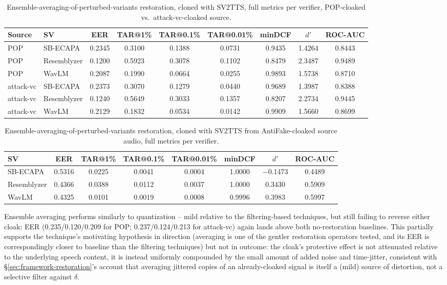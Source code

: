\documentclass[11pt]{article}
\begin{document}
\begin{table}[H]
\centering
\caption{Ensemble-averaging-of-perturbed-variants restoration, cloned
with SV2TTS, full metrics per verifier, POP-cloaked vs.\
attack-vc-cloaked source.}
\label{tab:restoration-ensemble-results}
\begin{tabular}{llccccccc}
\toprule
Source & SV & EER & TAR@1\% & TAR@0.1\% & TAR@0.01\% & minDCF & $d'$ & ROC-AUC \\
\midrule
POP        & SB-ECAPA    & 0.2345 & 0.3100 & 0.1388 & 0.0731 & 0.9435 & 1.4264 & 0.8443 \\
POP        & Resemblyzer & 0.1200 & 0.5923 & 0.3078 & 0.1102 & 0.8479 & 2.3487 & 0.9489 \\
POP        & WavLM       & 0.2087 & 0.1990 & 0.0664 & 0.0255 & 0.9893 & 1.5738 & 0.8710 \\
\addlinespace
attack-vc  & SB-ECAPA    & 0.2373 & 0.3070 & 0.1279 & 0.0440 & 0.9689 & 1.3987 & 0.8388 \\
attack-vc  & Resemblyzer & 0.1240 & 0.5649 & 0.3033 & 0.1357 & 0.8207 & 2.2734 & 0.9445 \\
attack-vc  & WavLM       & 0.2129 & 0.1832 & 0.0534 & 0.0142 & 0.9909 & 1.5660 & 0.8699 \\
\bottomrule
\end{tabular}
\end{table}

\begin{table}[H]
\centering
\caption{Ensemble-averaging-of-perturbed-variants restoration, cloned
with SV2TTS from AntiFake-cloaked source audio, full metrics per
verifier.}
\label{tab:restoration-ensemble-antifake-results}
\begin{tabular}{lccccccc}
\toprule
SV & EER & TAR@1\% & TAR@0.1\% & TAR@0.01\% & minDCF & $d'$ & ROC-AUC \\
\midrule
SB-ECAPA    & 0.5316 & 0.0225 & 0.0041 & 0.0004 & 1.0000 & $-$0.1473 & 0.4489 \\
Resemblyzer & 0.4366 & 0.0388 & 0.0112 & 0.0037 & 1.0000 & 0.3430 & 0.5909 \\
WavLM       & 0.4325 & 0.0101 & 0.0019 & 0.0008 & 0.9996 & 0.3983 & 0.5997 \\
\bottomrule
\end{tabular}
\end{table}

Ensemble averaging performs similarly to quantization -- mild relative
to the filtering-based techniques, but still failing to reverse either
cloak: EER (0.235/0.120/0.209 for POP; 0.237/0.124/0.213 for
attack-vc) again lands above both no-restoration baselines. This
partially supports the technique's motivating hypothesis in direction
(averaging is one of the gentler restoration operators tested, and its
EER is correspondingly closer to baseline than the filtering
techniques) but not in outcome: the cloak's protective effect is not
attenuated relative to the underlying speech content, it is instead
uniformly compounded by the small amount of added noise and
time-jitter, consistent with \S\ref{sec:framework-restoration}'s
account that averaging jittered copies of an already-cloaked signal is
itself a (mild) source of distortion, not a selective filter against
$\delta$.
\end{document}
